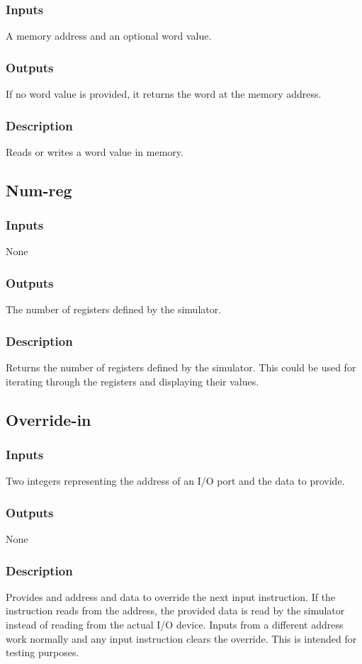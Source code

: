 \documentclass[10pt, openany]{book}
\begin{document}
\subsubsection{Inputs}
A memory address and an optional word value.
\subsubsection{Outputs}
If no word value is provided, it returns the word at the memory address.
\subsubsection{Description}
Reads or writes a word value in memory.

\subsection{Num-reg}
\subsubsection{Inputs}
None
\subsubsection{Outputs}
The number of registers defined by the simulator.
\subsubsection{Description}
Returns the number of registers defined by the simulator.  This could be used for iterating through the registers and displaying their values.

\subsection{Override-in}
\subsubsection{Inputs}
Two integers representing the address of an I/O port and the data to provide.
\subsubsection{Outputs}
None
\subsubsection{Description}
Provides and address and data to override the next input instruction.  If the instruction reads from the address, the provided data is read by the simulator instead of reading from the actual I/O device.  Inputs from a different address work normally and any input instruction clears the override.  This is intended for testing purposes.
\end{document}
